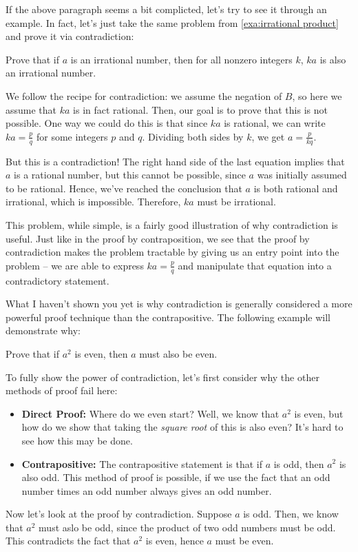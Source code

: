 If the above paragraph seems a bit complicted, let's try to see it through an example. In fact, let's just take 
the same problem from \ref{exa:irrational product} and prove it via contradiction:

\begin{example}{}{}
	Prove that if \( a \) is an irrational number, then for all nonzero integers \( k \), \( ka \) is also an 
	irrational number. 

	We follow the recipe for contradiction: we assume the negation of \( B \), so here we assume that \( ka \) is 
	in fact rational. Then, our goal is to prove that this is not possible. One way we could do this is that since 
	\( ka  \) is rational, we can write \( ka = \frac{p}{q} \) for some integers \( p \) and \( q \). Dividing 
	both sides by \( k \), we get \( a = \frac{p}{kq} \). 

	But this is a contradiction! The right hand side of the last equation implies that \( a \) is a rational number, 
	but this cannot be possible, since \( a \) was initially assumed to be rational. Hence, we've reached 
	the conclusion that \( a \) is both rational and irrational, which is impossible. Therefore, 
	\( ka \) must be irrational. 

\end{example}

This problem, while simple, is a fairly good illustration of why contradiction is useful. Just like in the proof 
by contraposition, we see that the proof by contradiction makes the problem tractable by giving us an entry 
point into the problem -- we are able to express \( ka = \frac{p}{q} \) and manipulate that equation into 
a contradictory statement.  

What I haven't shown you yet is why contradiction is generally considered a more powerful proof technique than 
the contrapositive. The following example will demonstrate why:

\begin{example}{}{}
	Prove that if \( a^2 \) is even, then \( a \) must also be even. 

	To fully show the power of contradiction, let's first consider why the other methods of proof fail here:
	\begin{itemize}
		\item \textbf{Direct Proof:}
			Where do we even start? Well, we know that \( a^2 \) is even, but how do we show that 
			taking the \textit{square root} of this is also even? It's hard to see how this may be done.  
		\item \textbf{Contrapositive:} The contrapositive statement is that if \( a \) is odd, then 
			\( a^2 \) is also odd. This method of proof is possible, if we use the fact that an odd number times an 
			odd number always gives an odd number. 
	\end{itemize}
	Now let's look at the proof by contradiction. Suppose \( a \) is odd. Then, we know that \( a^2 \) must 
	aslo be odd, since the product of two odd numbers must be odd. This contradicts the fact that \( a^2 \) 
	is even, hence \( a \) must be even. 
\end{example}
